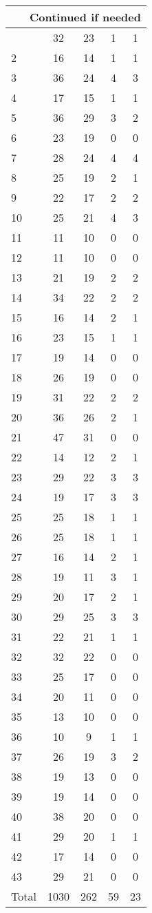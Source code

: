 \begin{center}
\begin{longtable}{l|c|c|c|c}
\hline \multicolumn{5}{|r|}{{Continued if needed}} \\ \hline
\endfoot 
1 & 32 & 23 & 1 & 1\\ \hline
2 & 16 & 14 & 1 & 1\\ \hline
3 & 36 & 24 & 4 & 3\\ \hline
4 & 17 & 15 & 1 & 1\\ \hline
5 & 36 & 29 & 3 & 2\\ \hline
6 & 23 & 19 & 0 & 0\\ \hline
7 & 28 & 24 & 4 & 4\\ \hline
8 & 25 & 19 & 2 & 1\\ \hline
9 & 22 & 17 & 2 & 2\\ \hline
10 & 25 & 21 & 4 & 3\\ \hline
11 & 11 & 10 & 0 & 0\\ \hline
12 & 11 & 10 & 0 & 0\\ \hline
13 & 21 & 19 & 2 & 2\\ \hline
14 & 34 & 22 & 2 & 2\\ \hline
15 & 16 & 14 & 2 & 1\\ \hline
16 & 23 & 15 & 1 & 1\\ \hline
17 & 19 & 14 & 0 & 0\\ \hline
18 & 26 & 19 & 0 & 0\\ \hline
19 & 31 & 22 & 2 & 2\\ \hline
20 & 36 & 26 & 2 & 1\\ \hline
21 & 47 & 31 & 0 & 0\\ \hline
22 & 14 & 12 & 2 & 1\\ \hline
23 & 29 & 22 & 3 & 3\\ \hline
24 & 19 & 17 & 3 & 3\\ \hline
25 & 25 & 18 & 1 & 1\\ \hline
26 & 25 & 18 & 1 & 1\\ \hline
27 & 16 & 14 & 2 & 1\\ \hline
28 & 19 & 11 & 3 & 1\\ \hline
29 & 20 & 17 & 2 & 1\\ \hline
30 & 29 & 25 & 3 & 3\\ \hline
31 & 22 & 21 & 1 & 1\\ \hline
32 & 32 & 22 & 0 & 0\\ \hline
33 & 25 & 17 & 0 & 0\\ \hline
34 & 20 & 11 & 0 & 0\\ \hline
35 & 13 & 10 & 0 & 0\\ \hline
36 & 10 & 9 & 1 & 1\\ \hline
37 & 26 & 19 & 3 & 2\\ \hline
38 & 19 & 13 & 0 & 0\\ \hline
39 & 19 & 14 & 0 & 0\\ \hline
40 & 38 & 20 & 0 & 0\\ \hline
41 & 29 & 20 & 1 & 1\\ \hline
42 & 17 & 14 & 0 & 0\\ \hline
43 & 29 & 21 & 0 & 0\\ \hline
\hline \hline
Total & 1030 & 262 & 59 & 23




\end{longtable}
\end{center}
